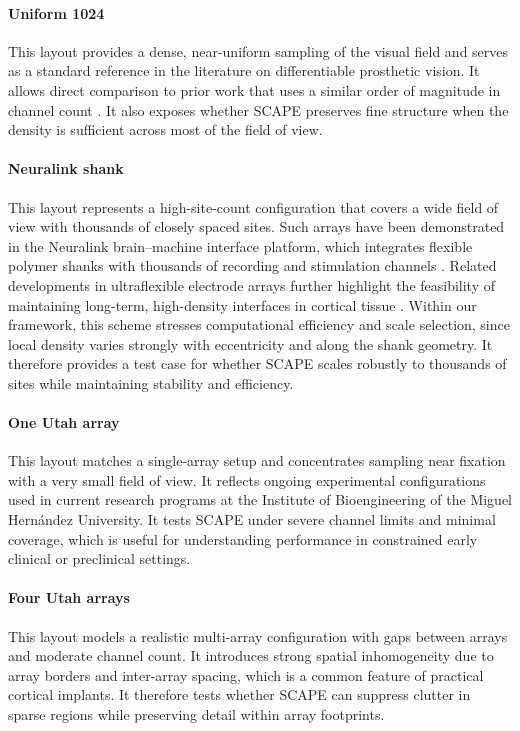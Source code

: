 \paragraph{Uniform 1024}
This layout provides a dense, near-uniform sampling of the visual field and serves as a standard reference in the literature on differentiable prosthetic vision. It allows direct comparison to prior work that uses a similar order of magnitude in channel count \cite{deRuytervanSteveninck2020}. It also exposes whether SCAPE preserves fine structure when the density is sufficient across most of the field of view.

\paragraph{Neuralink shank}
This layout represents a high-site-count configuration that covers a wide field of view with thousands of closely spaced sites. Such arrays have been demonstrated in the Neuralink brain–machine interface platform, which integrates flexible polymer shanks with thousands of recording and stimulation channels \cite{Musk2019}. Related developments in ultraflexible electrode arrays further highlight the feasibility of maintaining long-term, high-density interfaces in cortical tissue \cite{Zhao2023}. Within our framework, this scheme stresses computational efficiency and scale selection, since local density varies strongly with eccentricity and along the shank geometry. It therefore provides a test case for whether SCAPE scales robustly to thousands of sites while maintaining stability and efficiency.

\paragraph{One Utah array}
This layout matches a single-array setup and concentrates sampling near fixation with a very small field of view. It reflects ongoing experimental configurations used in current research programs at the Institute of Bioengineering of the Miguel Hernández University. It tests SCAPE under severe channel limits and minimal coverage, which is useful for understanding performance in constrained early clinical or preclinical settings.

\paragraph{Four Utah arrays}
This layout models a realistic multi-array configuration with gaps between arrays and moderate channel count. It introduces strong spatial inhomogeneity due to array borders and inter-array spacing, which is a common feature of practical cortical implants. It therefore tests whether SCAPE can suppress clutter in sparse regions while preserving detail within array footprints.


